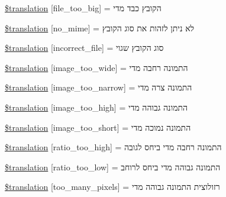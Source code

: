 \begin{DoxyCompactItemize}
\item 
\hyperlink{class_8upload_8he___i_l_8php_a476278eb4a0c3df56af068e2d511a741}{\$translation} \mbox{[}\textquotesingle{}file\+\_\+too\+\_\+big\textquotesingle{}\mbox{]} = \textquotesingle{}הקובץ כבד מדי\textquotesingle{}
\item 
\hyperlink{class_8upload_8he___i_l_8php_a191a55df8e3bb7f3c51b70f3c1932e02}{\$translation} \mbox{[}\textquotesingle{}no\+\_\+mime\textquotesingle{}\mbox{]} = \textquotesingle{}לא ניתן לזהות את סוג הקובץ\textquotesingle{}
\item 
\hyperlink{class_8upload_8he___i_l_8php_a4d32343e2699edd6fd435f9c832cb9c7}{\$translation} \mbox{[}\textquotesingle{}incorrect\+\_\+file\textquotesingle{}\mbox{]} = \textquotesingle{}סוג הקובץ שגוי\textquotesingle{}
\item 
\hyperlink{class_8upload_8he___i_l_8php_a0dd3e4930ca1f59ae280f4b1006525cd}{\$translation} \mbox{[}\textquotesingle{}image\+\_\+too\+\_\+wide\textquotesingle{}\mbox{]} = \textquotesingle{}התמונה רחבה מדי\textquotesingle{}
\item 
\hyperlink{class_8upload_8he___i_l_8php_a5c9a4cd67fd21c32e0a3b434591a6037}{\$translation} \mbox{[}\textquotesingle{}image\+\_\+too\+\_\+narrow\textquotesingle{}\mbox{]} = \textquotesingle{}התמונה צרה מדי\textquotesingle{}
\item 
\hyperlink{class_8upload_8he___i_l_8php_aa27bde361343f3b63c7cd441860024f8}{\$translation} \mbox{[}\textquotesingle{}image\+\_\+too\+\_\+high\textquotesingle{}\mbox{]} = \textquotesingle{}התמונה גבוהה מדי\textquotesingle{}
\item 
\hyperlink{class_8upload_8he___i_l_8php_a86fcd4e1157b00032df451188d735527}{\$translation} \mbox{[}\textquotesingle{}image\+\_\+too\+\_\+short\textquotesingle{}\mbox{]} = \textquotesingle{}התמונה נמוכה מדי\textquotesingle{}
\item 
\hyperlink{class_8upload_8he___i_l_8php_a23396f6ce7f31e5e5f1b57580621d982}{\$translation} \mbox{[}\textquotesingle{}ratio\+\_\+too\+\_\+high\textquotesingle{}\mbox{]} = \textquotesingle{}התמונה רחבה מדי ביחס לגובה\textquotesingle{}
\item 
\hyperlink{class_8upload_8he___i_l_8php_ac533b9a479f056b0b8623e4268f068c2}{\$translation} \mbox{[}\textquotesingle{}ratio\+\_\+too\+\_\+low\textquotesingle{}\mbox{]} = \textquotesingle{}התמונה גבוהה מדי ביחס לרוחב\textquotesingle{}
\item 
\hyperlink{class_8upload_8he___i_l_8php_aa4051ef64e94a3f8295c63cf85544016}{\$translation} \mbox{[}\textquotesingle{}too\+\_\+many\+\_\+pixels\textquotesingle{}\mbox{]} = \textquotesingle{}רזולוצית התמונה גבוהה מדי\textquotesingle{}

\end{DoxyCompactItemize}
